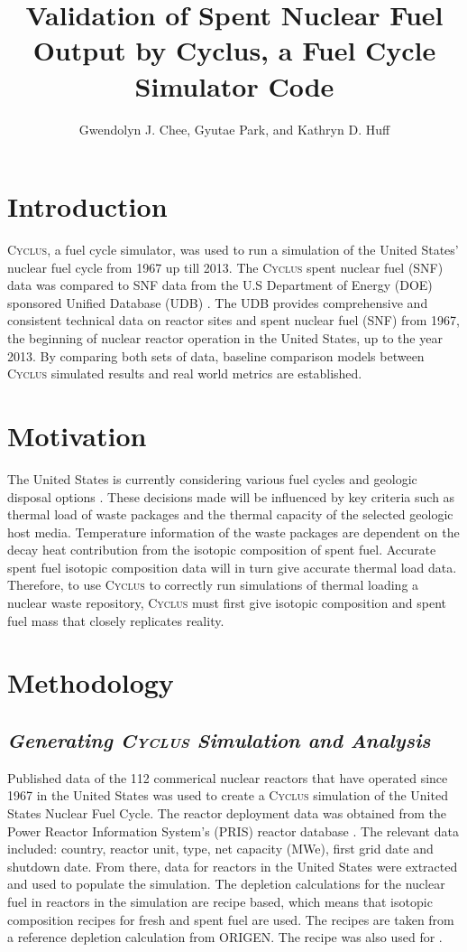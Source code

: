 \documentclass{anstrans}
\title{Validation of Spent Nuclear Fuel Output by Cyclus, a Fuel Cycle Simulator Code}
\author{Gwendolyn J. Chee, Gyutae Park, and Kathryn D. Huff}
\institute{
Dept. of Nuclear, Plasma and Radiological Engineering, University of Illinois at Urbana-Champaign \\
gchee2@illinois.edu
}
\newcommand{\Cyclus}{\textsc{Cyclus}\xspace}%
\begin{document}
\section{Introduction}
\Cyclus \cite{huff_fundamentals_2016}, a fuel cycle simulator, was used to run a simulation of the
United States' nuclear fuel cycle from 1967 up till 2013. The \Cyclus spent nuclear fuel (SNF) data was compared to SNF data from the U.S Department of Energy (DOE) sponsored Unified Database (UDB) \cite{Peterson_UNF_2017}. The UDB provides comprehensive and consistent technical data on reactor sites and spent nuclear fuel (SNF) from 1967, the beginning of nuclear reactor operation in the United States, up to the year 2013. By comparing both sets of data, baseline comparison models between \Cyclus simulated results and real world metrics are established. 

\section{Motivation}
The United States is currently considering various fuel cycles and geologic disposal options
\cite{DOE_strategy_2013}. These decisions made will be influenced by key criteria such as thermal load of waste packages and the thermal capacity of the selected geologic host media. Temperature information of the waste packages are dependent on the decay heat contribution from the isotopic composition of spent fuel. Accurate spent fuel isotopic composition data will in turn give accurate thermal load data. Therefore, to use \Cyclus to correctly run simulations of thermal loading a nuclear waste repository, \Cyclus must first give isotopic composition and spent fuel mass that closely replicates reality. 

\section{Methodology}
\subsection{\textit{Generating \Cyclus Simulation and Analysis}}
Published data of the 112 commerical nuclear reactors that have operated since 1967 in the United States was used to create a \Cyclus simulation of the United States Nuclear Fuel Cycle. The reactor deployment data was obtained from the Power Reactor Information System's (PRIS) reactor database \cite{IAEA_PRIS_2017}. The relevant data included: country, reactor unit, type, net capacity (MWe), first grid date and shutdown date. From there, data for reactors in the United States were extracted and used to populate the simulation. The depletion calculations for the nuclear fuel in reactors in the simulation are recipe based, which means that isotopic composition recipes for fresh and spent fuel are used. The recipes are taken from a reference depletion calculation from ORIGEN. The recipe was also used for \cite{Bae_Synergistic_2017 and Wilson_adoption_2009}. 
\end{document}
